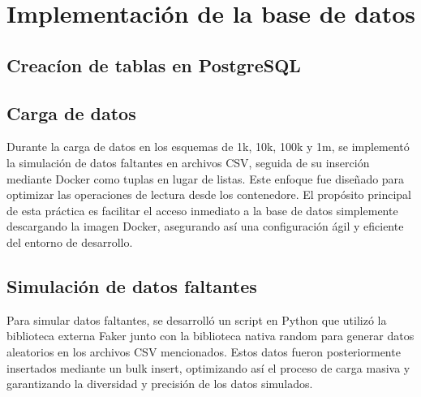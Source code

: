 \section{Implementación de la base de datos}
\subsection{Creacíon de tablas en PostgreSQL}
\subsection{Carga de datos} {Durante la carga de datos en los esquemas de 1k, 10k, 100k y 1m, se implementó la simulación de datos faltantes en archivos CSV, seguida de su inserción mediante Docker como tuplas en lugar de listas. Este enfoque fue diseñado para optimizar las operaciones de lectura desde los contenedore. El propósito principal de esta práctica es facilitar el acceso inmediato a la base de datos simplemente descargando la imagen Docker, asegurando así una configuración ágil y eficiente del entorno de desarrollo.}
\subsection{Simulación de datos faltantes} {Para simular datos faltantes, se desarrolló un script en Python que utilizó la biblioteca externa Faker junto con la biblioteca nativa random para generar datos aleatorios en los archivos CSV mencionados. Estos datos fueron posteriormente insertados mediante un bulk insert, optimizando así el proceso de carga masiva y garantizando la diversidad y precisión de los datos simulados.}